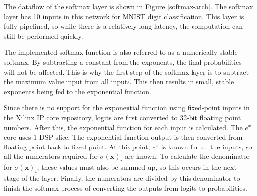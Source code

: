 The dataflow of the softmax layer is shown in Figure \ref{softmax-arch}. The softmax layer has 10 inputs in this network for MNIST digit classification. This layer is fully pipelined, so while there is a relatively long latency, the computation can still be performed quickly. 

The implemented softmax function is also referred to as a numerically stable softmax. By subtracting a constant from the exponents, the final probabilities will not be affected. This is why the first step of the softmax layer is to subtract the maximum value input from all inputs. This then results in small, stable exponents being fed to the exponential function. 

Since there is no support for the exponential function using fixed-point inputs in the Xilinx IP core repository, logits are first converted to 32-bit floating point numbers. After this, the exponential function for each input is calculated. The $e^x$ core uses 1 DSP slice. The exponential function output is then converted from floating point back to fixed point. At this point, $e^x$ is known for all the inputs, so all the numerators required for $\sigma(\mathbf{x})_i$ are known. To calculate the denominator for $\sigma(\mathbf{x})_i$, these values must also be summed up, so this occurs in the next stage of the layer. Finally, the numerators are divided by this denominator to finish the softmax process of converting the outputs from logits to probabilities.
